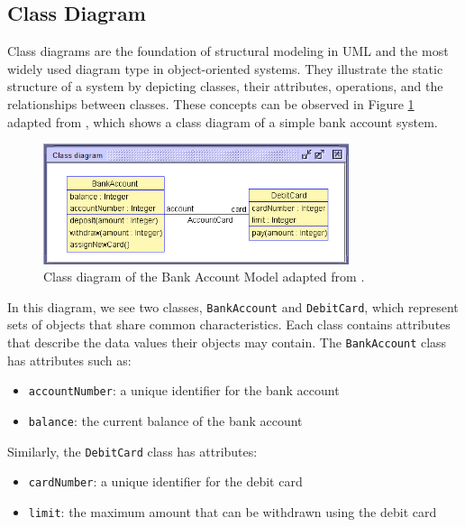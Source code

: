 \subsection{Class Diagram}
\hspace{1cm} Class diagrams are the foundation of structural modeling in UML and the most widely 
used diagram type in object-oriented systems. They illustrate the static structure 
of a system by depicting classes, their attributes, operations, and the relationships 
between classes. These concepts can be observed in Figure 
\ref{fig:class_diagram_bank_account_model} adapted from \cite{TPV}, 
which shows a class diagram of a simple bank account system.

\begin{figure}
    \begin{center}
        \includegraphics[width=0.8\textwidth]{figures/c1/BankAccount/BankAccount_ClassDiagram.png}
        \caption{Class diagram of the Bank Account Model adapted from \cite{TPV}.}
        \label{fig:class_diagram_bank_account_model}
    \end{center}
\end{figure}

In this diagram, we see two classes, \texttt{BankAccount} and \texttt{DebitCard}, 
which represent sets of objects that share common characteristics. Each class 
contains attributes that describe the data values their objects may contain. 
The \texttt{BankAccount} class has attributes such as:
\begin{itemize}
    \item \texttt{accountNumber}: a unique identifier for the bank account
    \item \texttt{balance}: the current balance of the bank account
\end{itemize}
Similarly, the \texttt{DebitCard} class has attributes:
\begin{itemize}
    \item \texttt{cardNumber}: a unique identifier for the debit card
    \item \texttt{limit}: the maximum amount that can be withdrawn using the debit card
\end{itemize}

